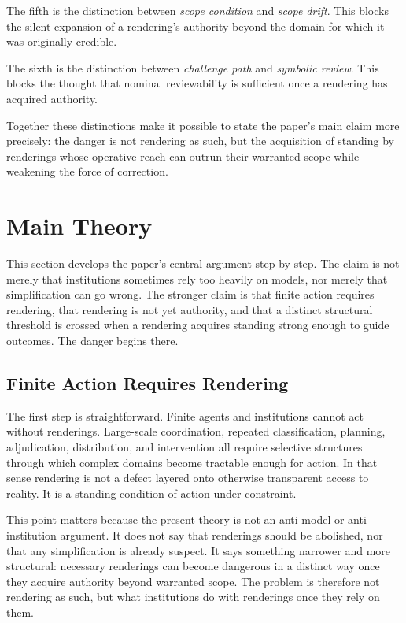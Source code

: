 \documentclass[11pt]{article}
\renewcommand{\emph}[1]{\textit{#1}}
\begin{document}
The fifth is the distinction between \emph{scope condition} and \emph{scope drift}. This blocks the silent expansion of a rendering's authority beyond the domain for which it was originally credible.

The sixth is the distinction between \emph{challenge path} and \emph{symbolic review}. This blocks the thought that nominal reviewability is sufficient once a rendering has acquired authority.

Together these distinctions make it possible to state the paper's main claim more precisely: the danger is not rendering as such, but the acquisition of standing by renderings whose operative reach can outrun their warranted scope while weakening the force of correction.
\section{Main Theory}

This section develops the paper's central argument step by step. The claim is not merely that institutions sometimes rely too heavily on models, nor merely that simplification can go wrong. The stronger claim is that finite action requires rendering, that rendering is not yet authority, and that a distinct structural threshold is crossed when a rendering acquires standing strong enough to guide outcomes. The danger begins there.

\subsection{Finite Action Requires Rendering}

The first step is straightforward. Finite agents and institutions cannot act without renderings. Large-scale coordination, repeated classification, planning, adjudication, distribution, and intervention all require selective structures through which complex domains become tractable enough for action. In that sense rendering is not a defect layered onto otherwise transparent access to reality. It is a standing condition of action under constraint.\cite{Simon1996SciencesArtificial,FriggNguyen2020ModellingNature,Swanson2026ConstrainedDescribability}

This point matters because the present theory is not an anti-model or anti-institution argument. It does not say that renderings should be abolished, nor that any simplification is already suspect. It says something narrower and more structural: necessary renderings can become dangerous in a distinct way once they acquire authority beyond warranted scope. The problem is therefore not rendering as such, but what institutions do with renderings once they rely on them.
\end{document}
